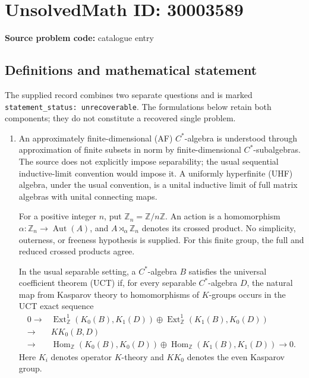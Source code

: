 \documentclass[11pt]{article}
\begin{document}
\section*{UnsolvedMath ID: 30003589}
\textbf{Source problem code:} catalogue entry
\subsection{Definitions and mathematical statement}
The supplied record combines two separate questions and is marked \texttt{statement\_status: unrecoverable}. The formulations below retain both components; they do not constitute a recovered single problem.

\begin{enumerate}
\item An approximately finite-dimensional (AF) \(C^*\)-algebra is understood through approximation of finite subsets in norm by finite-dimensional \(C^*\)-subalgebras. The source does not explicitly impose separability; the usual sequential inductive-limit convention would impose it. A uniformly hyperfinite (UHF) algebra, under the usual convention, is a unital inductive limit of full matrix algebras with unital connecting maps.

For a positive integer \(n\), put \(\mathbb Z_n=\mathbb Z/n\mathbb Z\). An action is a homomorphism \(\alpha\colon\mathbb Z_n\to\operatorname{Aut}(A)\), and \(A\rtimes_\alpha\mathbb Z_n\) denotes its crossed product. No simplicity, outerness, or freeness hypothesis is supplied. For this finite group, the full and reduced crossed products agree.

In the usual separable setting, a \(C^*\)-algebra \(B\) satisfies the universal coefficient theorem (UCT) if, for every separable \(C^*\)-algebra \(D\), the natural map from Kasparov theory to homomorphisms of \(K\)-groups occurs in the UCT exact sequence
\[
\begin{split}
0\longrightarrow{}&\operatorname{Ext}^1_{\mathbb Z}(K_0(B),K_1(D))
\oplus\operatorname{Ext}^1_{\mathbb Z}(K_1(B),K_0(D))\\
\longrightarrow{}&KK_0(B,D)\\
\longrightarrow{}&\operatorname{Hom}_{\mathbb Z}(K_0(B),K_0(D))
\oplus\operatorname{Hom}_{\mathbb Z}(K_1(B),K_1(D))
\longrightarrow0.
\end{split}
\]
Here \(K_i\) denotes operator \(K\)-theory and \(KK_0\) denotes the even Kasparov group.


\end{enumerate}
\end{document}
